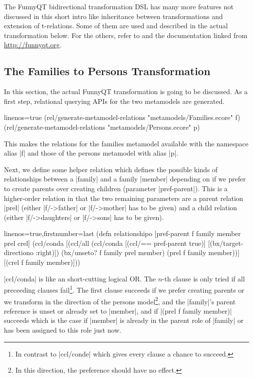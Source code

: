 \documentclass[a4paper]{article}
\newcommand{\code}{\clojureinline}
\begin{document}
The FunnyQT bidirectional transformation DSL has many more features not
discussed in this short intro like inheritance between transformations and
extension of t-relations.  Some of them are used and described in the actual
transformation below.  For the others, refer to \cite{diss} and the
documentation linked from \url{http://funnyqt.org}.


\subsection{The Families to Persons Transformation}
\label{sec:f2p-solution}

In this section, the actual FunnyQT transformation is going to be discussed.
As a first step, relational querying APIs for the two metamodels are generated.

\begin{clojurecode*}{linenos=true}
(rel/generate-metamodel-relations "metamodels/Families.ecore" f)
(rel/generate-metamodel-relations "metamodels/Persons.ecore" p)
\end{clojurecode*}

This makes the relations for the families metamodel available with the
namespace alias \code|f| and those of the persons metamodel with alias
\code|p|.

Next, we define some helper relation which defines the possible kinds of
relationships between a \code|family| and a family \code|member| depending on
if we prefer to create parents over creating children (parameter
\code|pref-parent|).  This is a higher-order relation in that the two remaining
parameters are a parent relation \code|prel| (either \code|f/->father| or
\code|f/->mother| has to be given) and a child relation (either
\code|f/->daughters| or \code|f/->sons| has to be given).

\begin{clojurecode*}{linenos=true,firstnumber=last}
(defn relationshipo [pref-parent f family member prel crel]
  (ccl/conda
   [(ccl/all
     (ccl/conda
      [(ccl/== pref-parent true)]
      [(bx/target-directiono :right)])
     (bx/unseto? f family prel member)
     (prel f family member))]
   [(crel f family member)]))
\end{clojurecode*}

\code|ccl/conda| is like an short-cutting logical OR.  The \(n\)-th clause is
only tried if all preceeding clauses fail\footnote{In contrast to
  \code|ccl/conde| which gives every clause a chance to succeed.}.  The first
clause succeeds if we prefer creating parents or we transform in the direction
of the persons model\footnote{In this direction, the preference should have no
  effect.}, and the \code|family|'s parent reference is unset or already set to
\code|member|, and if \code|(prel f family member)| succeeds which is the case
if \code|member| is already in the parent role of \code|family| or has been
assigned to this role just now.
\end{document}
